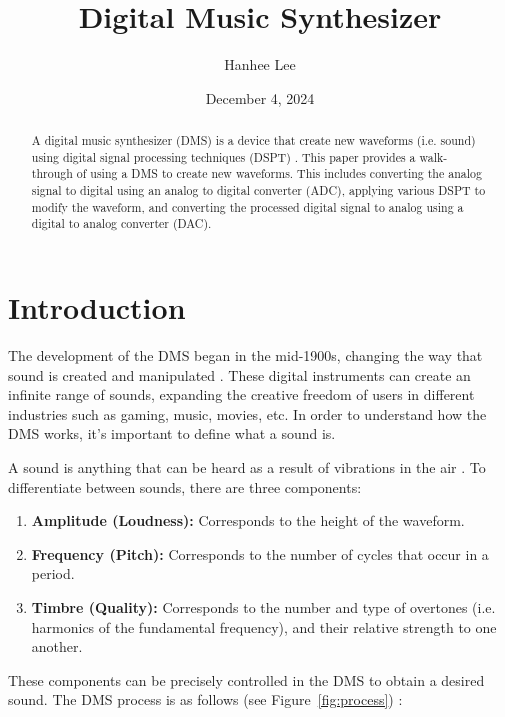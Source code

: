 \documentclass[12pt]{article}
\title{\textbf{Digital Music Synthesizer}}
\author{Hanhee Lee}
\date{December 4, 2024}
\begin{document}
\maketitle
\begin{abstract}
A digital music synthesizer (DMS) is a device that create new waveforms (i.e. sound) using digital signal processing techniques (DSPT) \cite{Wiki}. This paper provides a walk-through of using a DMS to create new waveforms. This includes converting the analog signal to digital using an analog to digital converter (ADC), applying various DSPT to modify the waveform, and converting the processed digital signal to analog using a digital to analog converter (DAC). 
\end{abstract}

\section{Introduction} 
The development of the DMS began in the mid-1900s, changing the way that sound is created and manipulated \cite{AES}. These digital instruments can create an infinite range of sounds, expanding the creative freedom of users in different industries such as gaming, music, movies, etc. In order to understand how the DMS works, it's important to define what a sound is.

\vspace{1em}

A sound is anything that can be heard as a result of vibrations in the air \cite{SS}. To differentiate between sounds, there are three components: 
\begin{enumerate}
    \item \textbf{Amplitude (Loudness):} Corresponds to the height of the waveform.
    \item \textbf{Frequency (Pitch):} Corresponds to the number of cycles that occur in a period.
    \item \textbf{Timbre (Quality):} Corresponds to the number and type of overtones (i.e. harmonics of the fundamental frequency), and their relative strength to one another.
\end{enumerate}

These components can be precisely controlled in the DMS to obtain a desired sound. The DMS process is as follows (see Figure~\ref{fig:process}) \cite{WASIM}:
\end{document}
